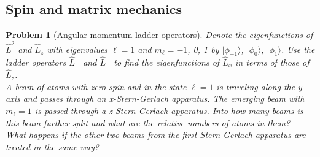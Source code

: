 \documentclass[a4paper]{article}
\theoremstyle{new}
\newtheorem{qns}{Problem}[section]
\begin{document}
\subsection*{Spin and matrix mechanics}
\begin{qns}[Angular momentum ladder operators]
Denote the eigenfunctions of $\hat{L}^2$ and $\hat{L}_z$ with eigenvalues $\ell= 1$ and $m_\ell =-1$, 0, 1 by $|\phi_{-1}\rangle$, $|\phi_0\rangle$, $|\phi_1\rangle$. Use the ladder operators $\hat{L}_+$ and $\hat{L}_-$ to find the eigenfunctions of $\hat{L}_x$ in terms of those of $\hat{L}_z$.\\[5pt]
A beam of atoms with zero spin and in the state $\ell= 1$ is traveling along the $y$-axis and passes through an x-Stern-Gerlach apparatus. The emerging beam with $m_\ell = 1$ is passed through a z-Stern-Gerlach apparatus. Into how many beams is this beam further split and what are the relative numbers of atoms in them?\\[5pt]
What happens if the other two beams from the first Stern-Gerlach apparatus are treated in the same way?
\end{qns}
\end{document}

